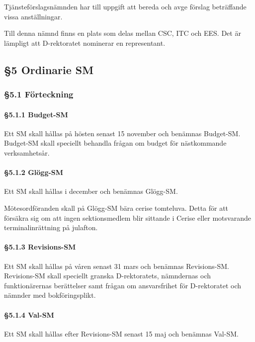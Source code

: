 Tjänsteförslagsnämnden har till uppgift att bereda och avge förslag beträffande vissa anställningar.

Till denna nämnd finns en plats som delas mellan CSC, ITC och EES. Det är lämpligt att D-rektoratet nominerar en representant.

\subsection{§5 Ordinarie SM}

\subsubsection{§5.1 Förteckning}

\paragraph{§5.1.1 Budget-SM}

Ett SM skall hållas på hösten senast 15 november och benämnas Budget-SM. Budget-SM skall speciellt behandla frågan om budget för nästkommande verksamhetsår.

\paragraph{§5.1.2 Glögg-SM}

Ett SM skall hållas i december och benämnas Glögg-SM.

Mötesordföranden skall på Glögg-SM bära cerise tomteluva. Detta för att försäkra sig om att ingen sektionsmedlem blir sittande i Cerise eller motsvarande terminalinrättning på julafton.

\paragraph{§5.1.3 Revisions-SM}

Ett SM skall hållas på våren senast 31 mars och benämnas Revisions-SM. Revisions-SM skall speciellt granska D-rektoratets, nämndernas och funktionärernas berättelser samt frågan om ansvarsfrihet för D-rektoratet och nämnder med bokföringsplikt.

\paragraph{§5.1.4 Val-SM}

Ett SM skall hållas efter Revisions-SM senast 15 maj och benämnas Val-SM.

